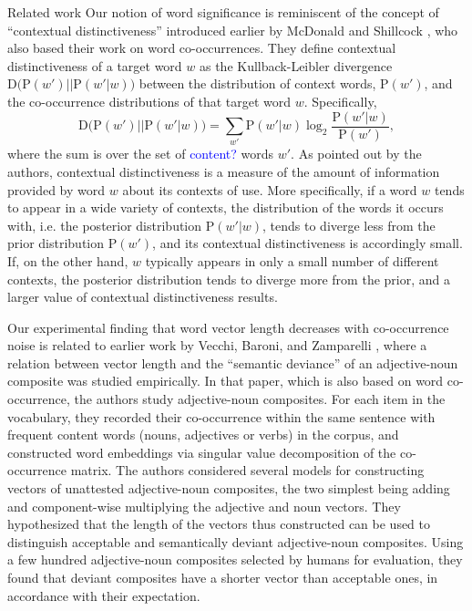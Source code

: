 \documentclass{article} %
\newcommand{\p}{\mathrm{P}}
\begin{document}
\begin{section}{Related work}\label{related-work}
Our notion of word significance is reminiscent of the concept of
``contextual distinctiveness'' introduced earlier by McDonald and
Shillcock \cite{mcdonald2001contextual}, who also based their work on word co-occurrences.
They define contextual distinctiveness of a target word $w$ as the
Kullback-Leibler divergence $\mathrm{D} \big(\p(w') ||\p(w'|w) \big)$
between the distribution of context words, $\p(w')$, and the
co-occurrence distributions of that target word $w$.  Specifically,
\begin{equation} 
\label{cd}
\mathrm{D} \big(\p(w') ||\p(w'|w) \big) = \sum_{w'} \p(w'|w) \log_2
\frac{\p(w'|w)}{\p(w')},
\end{equation} 
where the sum is over the set of \textcolor{blue}{content?} words $w'$.
As pointed out by the
authors, contextual distinctiveness is a measure of the amount of
information provided by word $w$ about its contexts of use.  More specifically, if a
word $w$ tends to appear in a wide variety of contexts, the distribution
of the words it occurs with, i.e. the posterior distribution $\p(w'|w)$,
tends to diverge less from the prior distribution $\p(w')$, and its
contextual distinctiveness is accordingly small.  If, on the other hand,
$w$ typically appears in only a small number of different contexts, the
posterior distribution tends to diverge more from the prior, and a
larger value of contextual distinctiveness results.

Our experimental finding that word vector length decreases with
co-occurrence noise is related to earlier work by Vecchi, Baroni, and
Zamparelli \cite{vecchi-baroni-zamparelli2011}, where a relation between
vector length and the ``semantic deviance'' of an adjective-noun
composite was studied empirically.  In that paper, which is also based
on word co-occurrence, the authors study adjective-noun composites.
For each item in the vocabulary, they
recorded their co-occurrence within the same sentence with 
 frequent content words (nouns, adjectives or verbs) in the
corpus, and constructed word embeddings via 
singular value decomposition of the co-occurrence matrix.  The authors considered several models for
constructing vectors of unattested adjective-noun composites, the two
simplest being adding and component-wise multiplying the adjective and
noun vectors.  They hypothesized that the length of the vectors thus
constructed can be used to distinguish acceptable and semantically
deviant adjective-noun composites.  Using a few hundred adjective-noun
composites selected by humans for evaluation, they found that deviant
composites have a shorter vector than acceptable ones, in accordance
with their expectation.


\end{section}
\end{document}
